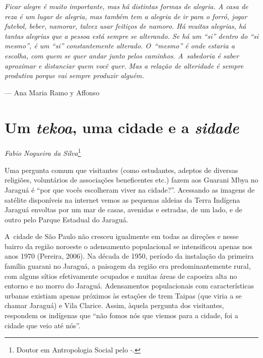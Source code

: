 \clearpage

\vspace*{\fill}

\begin{flushleft}
\begin{minipage}[c]{0.85\textwidth}
\raggedright
\footnotesize
\emph{Ficar alegre é muito importante, mas há distintas formas de alegria. A
casa de reza é um lugar de alegria, mas também tem a alegria de ir para
o forró, jogar futebol, beber, namorar, talvez usar feitiços de namoro.
Há muitas alegrias, há tantas alegrias que a pessoa está sempre se
alterando. Se há um ``si'' dentro do ``si mesmo'', é um ``si'' constantemente
alterado. O~``mesmo'' é onde estaria a escolha, com quem se quer andar
junto pelos caminhos. A~sabedoria é saber aproximar e distanciar quem
você quer. Mas a relação de alteridade é sempre produtiva porque vai
sempre produzir alguém.}

\smallskip
\hspace*{\fill}--- Ana Maria Ramo y Affonso
\end{minipage}
\end{flushleft}

\chapter{Um \emph{tekoa}, uma cidade e a \emph{sidade}}
\begin{flushright}
\emph{Fabio Nogueira da Silva}\footnote{Doutor em Antropologia Social pelo
-.}
\end{flushright}
\bigskip

\noindent Uma pergunta comum que visitantes (como estudantes, adeptos de diversas
religiões, voluntários de associações beneficentes etc.) fazem aos
Guarani Mbya no Jaraguá é ``por que vocês escolheram viver na cidade?''.
Acessando as imagens de satélite disponíveis na internet vemos as
pequenas aldeias da Terra Indígena Jaraguá envoltas por um mar de
casas, avenidas e estradas, de um lado, e de outro pelo Parque Estadual
do Jaraguá. 

A~cidade de São Paulo não cresceu igualmente em todas as direções e
nesse bairro da região noroeste o adensamento populacional se
intensificou apenas nos anos 1970 (Pereira, 2006). Na década de 1950,
período da instalação da primeira família guarani no Jaraguá, a
paisagem da região era predominantemente rural, com alguns sítios
efetivamente ocupados e muitas áreas de capoeira alta no entorno e no
morro do Jaraguá. Adensamentos populacionais com características
urbanas existiam apenas próximos às estações de trem Taipas (que viria
a se chamar Jaraguá) e Vila Clarice. Assim, àquela pergunta dos
visitantes, respondem os indígenas que ``não fomos nós que viemos para a
cidade, foi a cidade que veio até nós''. 

